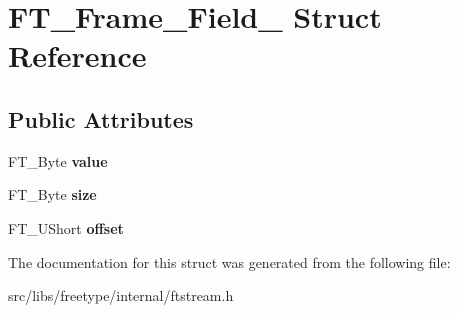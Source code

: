 \hypertarget{struct_f_t___frame___field__}{
\section{FT\_\-Frame\_\-Field\_\- Struct Reference}
\label{struct_f_t___frame___field__}
}
\subsection*{Public Attributes}
\begin{DoxyCompactItemize}
\item 
\hypertarget{struct_f_t___frame___field___a10f91dcdd0a582727b67ad45d42bab41}{
FT\_\-Byte {\bfseries value}}
\label{struct_f_t___frame___field___a10f91dcdd0a582727b67ad45d42bab41}

\item 
\hypertarget{struct_f_t___frame___field___a47e6fbcb90c079421d9d9b64f63a587e}{
FT\_\-Byte {\bfseries size}}
\label{struct_f_t___frame___field___a47e6fbcb90c079421d9d9b64f63a587e}

\item 
\hypertarget{struct_f_t___frame___field___a85c3275fbb7044f7d6880020b6f0f794}{
FT\_\-UShort {\bfseries offset}}
\label{struct_f_t___frame___field___a85c3275fbb7044f7d6880020b6f0f794}

\end{DoxyCompactItemize}


The documentation for this struct was generated from the following file:\begin{DoxyCompactItemize}
\item 
src/libs/freetype/internal/ftstream.h\end{DoxyCompactItemize}
